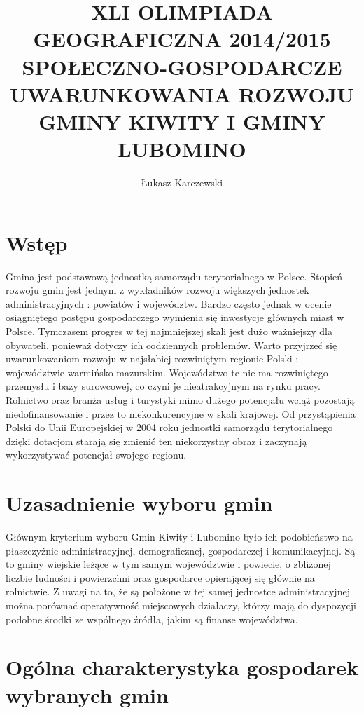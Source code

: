 \documentclass[a4paper,10pt]{article}
\title{XLI OLIMPIADA GEOGRAFICZNA 2014/2015 SPOŁECZNO-GOSPODARCZE UWARUNKOWANIA ROZWOJU GMINY KIWITY I GMINY LUBOMINO}
\author{Łukasz Karczewski}
\begin{document}
\maketitle
\newpage
\tableofcontents
\newpage

\section{Wstęp}
  Gmina jest podstawową jednostką samorządu terytorialnego w Polsce. 
  Stopień rozwoju gmin jest jednym z wykładników rozwoju większych jednostek administracyjnych : powiatów i województw. 
  Bardzo często jednak w ocenie osiągniętego postępu gospodarczego wymienia się inwestycje głównych miast w Polsce. 
  Tymczasem progres w tej najmniejszej skali jest dużo ważniejszy dla obywateli, ponieważ dotyczy ich codziennych problemów.
  Warto przyjrzeć się uwarunkowaniom rozwoju w najsłabiej rozwiniętym regionie Polski : województwie warmińsko-mazurskim. 
  Województwo te nie ma rozwiniętego przemysłu i bazy surowcowej, co czyni je nieatrakcyjnym na rynku pracy. 
  Rolnictwo oraz branża usług i turystyki mimo dużego potencjału wciąż pozostają niedofinansowanie i przez to niekonkurencyjne w skali krajowej. 
  Od przystąpienia Polski do Unii Europejskiej w 2004 roku jednostki samorządu terytorialnego dzięki dotacjom starają się zmienić ten niekorzystny obraz 
  i zaczynają wykorzystywać potencjał swojego regionu.
\section{Uzasadnienie wyboru gmin}
  Głównym kryterium wyboru Gmin Kiwity i Lubomino było ich podobieństwo na płaszczyźnie administracyjnej, demograficznej, gospodarczej i komunikacyjnej. 
  Są to gminy wiejskie leżące w tym samym województwie i powiecie, o zbliżonej liczbie ludności i powierzchni oraz gospodarce opierającej się głównie na rolnictwie. 
  Z uwagi na to, że są położone w tej samej jednostce administracyjnej można porównać operatywność miejscowych działaczy, 
  którzy mają do dyspozycji podobne środki ze wspólnego źródła, jakim są finanse województwa.
  
\newpage
\section{Ogólna charakterystyka gospodarek wybranych gmin}
\end{document}
